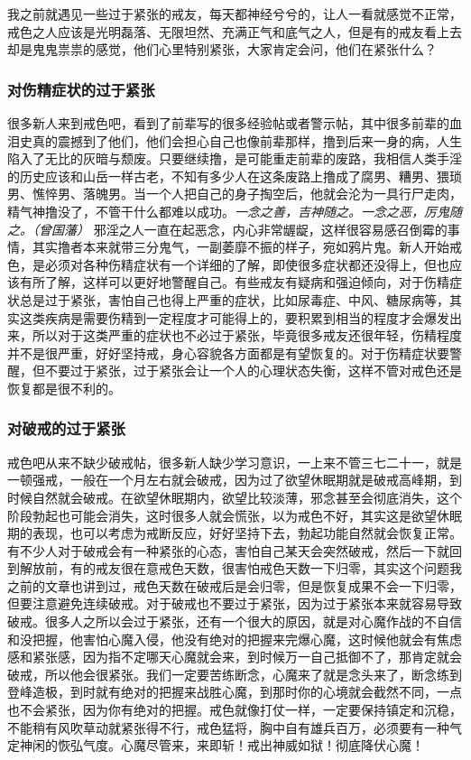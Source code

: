 我之前就遇见一些过于紧张的戒友，每天都神经兮兮的，让人一看就感觉不正常，戒色之人应该是光明磊落、无限坦然、充满正气和底气之人，但是有的戒友看上去却是鬼鬼祟祟的感觉，他们心里特别紧张，大家肯定会问，他们在紧张什么？

\subsubsection{对伤精症状的过于紧张}

很多新人来到戒色吧，看到了前辈写的很多经验帖或者警示帖，其中很多前辈的血泪史真的震撼到了他们，他们会担心自己也像前辈那样，撸到后来一身的病，人生陷入了无比的灰暗与颓废。只要继续撸，是可能重走前辈的废路，我相信人类手淫的历史应该和山岳一样古老，不知有多少人在这条废路上撸成了腐男、糟男、猥琐男、憔悴男、落魄男。当一个人把自己的身子掏空后，他就会沦为一具行尸走肉，精气神撸没了，不管干什么都难以成功。\textit{一念之善，吉神随之。一念之恶，厉鬼随之。（曾国藩）} 邪淫之人一直在起恶念，内心非常龌龊，这样很容易感召倒霉的事情，其实撸者本来就带三分鬼气，一副萎靡不振的样子，宛如鸦片鬼。新人开始戒色，是必须对各种伤精症状有一个详细的了解，即使很多症状都还没得上，但也应该有所了解，这样可以更好地警醒自己。有些戒友有疑病和强迫倾向，对于伤精症状总是过于紧张，害怕自己也得上严重的症状，比如尿毒症、中风、糖尿病等，其实这类疾病是需要伤精到一定程度才可能得上的，要积累到相当的程度才会爆发出来，所以对于这类严重的症状也不必过于紧张，毕竟很多戒友还很年轻，伤精程度并不是很严重，好好坚持戒，身心容貌各方面都是有望恢复的。对于伤精症状要警醒，但不要过于紧张，过于紧张会让一个人的心理状态失衡，这样不管对戒色还是恢复都是很不利的。

\subsubsection{对破戒的过于紧张}

戒色吧从来不缺少破戒帖，很多新人缺少学习意识，一上来不管三七二十一，就是一顿强戒，一般在一个月左右就会破戒，因为过了欲望休眠期就是破戒高峰期，到时候自然就会破戒。在欲望休眠期内，欲望比较淡薄，邪念甚至会彻底消失，这个阶段勃起也可能会消失，这时很多人就会慌张，以为戒色不好，其实这是欲望休眠期的表现，也可以考虑为戒断反应，好好坚持下去，勃起功能自然就会恢复正常。有不少人对于破戒会有一种紧张的心态，害怕自己某天会突然破戒，然后一下就回到解放前，有的戒友很在意戒色天数，很害怕戒色天数一下归零，其实这个问题我之前的文章也讲到过，戒色天数在破戒后是会归零，但是恢复成果不会一下归零，但要注意避免连续破戒。对于破戒也不要过于紧张，因为过于紧张本来就容易导致破戒。很多人之所以会过于紧张，还有一个很大的原因，就是对心魔作战的不自信和没把握，他害怕心魔入侵，他没有绝对的把握来完爆心魔，这时候他就会有焦虑感和紧张感，因为指不定哪天心魔就会来，到时候万一自己抵御不了，那肯定就会破戒，所以他会很紧张。我们一定要苦练断念，心魔来了就是念头来了，断念练到登峰造极，到时就有绝对的把握来战胜心魔，到那时你的心境就会截然不同，一点也不会紧张，因为你有绝对的把握。戒色就像打仗一样，一定要保持镇定和沉稳，不能稍有风吹草动就紧张得不行，戒色猛将，胸中自有雄兵百万，必须要有一种气定神闲的恢弘气度。心魔尽管来，来即斩！戒出神威如狱！彻底降伏心魔！

